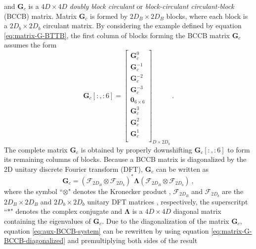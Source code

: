 and $\mathbf{G}_{c}$ is a $4D \times 4D$ \textit{doubly block circulant} \cite[][p. 28]{jain1989} or 
\textit{block-circulant circulant-block} (BCCB) \cite[][p. 76]{chan-jin2007} matrix.
Matrix $\mathbf{G}_{c}$ is formed by $2D_{B} \times 2D_{B}$ blocks, where each block is a 
$2D_{b} \times 2D_{b}$ circulant matrix.
By considering the example defined by equation \ref{eq:matrix-G-BTTB}, the first column of blocks forming the 
BCCB matrix $\mathbf{G}_{c}$ assumes the form
\begin{equation}
	\mathbf{G}_{c}[:,:6] = \begin{bmatrix}
		\mathbf{G}_{c}^{0} \\
		\mathbf{G}_{c}^{-1} \\
		\mathbf{G}_{c}^{-2} \\
		\mathbf{G}_{c}^{-3} \\
		\mathbf{0}_{6 \times 6} \\
		\mathbf{G}_{c}^{3} \\
		\mathbf{G}_{c}^{2} \\
		\mathbf{G}_{c}^{1} \\
	\end{bmatrix}_{D \times 2D_{b}} \: .
	\label{eq:matrix-G-BCCB-1st-block-column}
\end{equation}
The complete matrix $\mathbf{G}_{c}$ is obtained by properly downshifting $\mathbf{G}_{c}[:,:6]$ to
form its remaining columns of blocks.
Because a BCCB matrix is diagonalized by the 2D unitary discrete Fourier transform (DFT), 
$\mathbf{G}_{c}$ can be written as
\begin{equation}
	\mathbf{G}_{c} = 
	\left(\boldsymbol{\mathcal{F}}_{2D_{B}} \otimes \boldsymbol{\mathcal{F}}_{2D_{b}} \right)^{\ast} 
	\boldsymbol{\Lambda}
	\left(\boldsymbol{\mathcal{F}}_{2D_{B}} \otimes \boldsymbol{\mathcal{F}}_{2D_{b}} \right) \: ,
	\label{eq:matrix-G-BCCB-diagonalized}
\end{equation}
where the symbol ``$\otimes$" denotes the Kronecker product \cite[e.g.,][p. 243]{horn-johnson1991},
$\boldsymbol{\mathcal{F}}_{2D_{B}}$ and $\boldsymbol{\mathcal{F}}_{2D_{b}}$ are the $2D_{B} \times 2D_{B}$ and $2D_{b} \times 2D_{b}$ 
unitary DFT matrices \citep[e.g.,][ p. 31]{davis1979}, respectively, the superscritpt 
``$\ast$" denotes the complex conjugate and $\boldsymbol{\Lambda}$ is a 
$4D \times 4D$ diagonal matrix containing the eigenvalues of $\mathbf{G}_{c}$.
Due to the diagonalization of the matrix $\mathbf{G}_{c}$, 
equation \ref{eq:aux-BCCB-system} can be rewritten by using equation 
\ref{eq:matrix-G-BCCB-diagonalized} and premultiplying both sides of the result 
